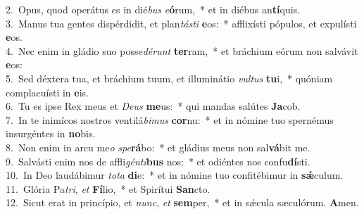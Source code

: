 {2.~}Opus, quod operátus es in dié\textit{bus} \textit{e}\textbf{ó}rum,~* et in diébus an\textbf{tí}quis.\\
{3.~}Manus tua gentes dispérdidit, et plan\textit{tá}\textit{sti} \textbf{e}os:~* afflixísti pópulos, et expulísti \textbf{e}os.\\
{4.~}Nec enim in gládio suo posse\textit{dé}\textit{runt} \textbf{ter}ram,~* et bráchium eórum non salvávit \textbf{e}os:\\
{5.~}Sed déxtera tua, et bráchium tuum, et illuminátio \textit{vul}\textit{tus} \textbf{tu}i,~* quóniam complacuísti in \textbf{e}is.\\
{6.~}Tu es ipse Rex meus et \textit{De}\textit{us} \textbf{me}us:~* qui mandas salútes \textbf{Ja}cob.\\
{7.~}In te inimícos nostros ventilá\textit{bi}\textit{mus} \textbf{cor}nu:~* et in nómine tuo spernémus insurgéntes in \textbf{no}bis.\\
{8.~}Non enim in arcu me\textit{o} \textit{spe}\textbf{rá}bo:~* et gládius meus non sal\textbf{vá}bit me.\\
{9.~}Salvásti enim nos de affli\textit{gén}\textit{ti}\textbf{bus} nos:~* et odiéntes nos confu\textbf{dí}sti.\\
{10.~}In Deo laudábimur \textit{to}\textit{ta} \textbf{di}e:~* et in nómine tuo confitébimur in \textbf{sǽ}culum.\\
{11.~}Glória Pa\textit{tri}, \textit{et} \textbf{Fí}lio,~* et Spirítui \textbf{San}cto.\\
{12.~}Sicut erat in princípio, et \textit{nunc}, \textit{et} \textbf{sem}per,~* et in sǽcula sæculórum. \textbf{A}men.\\
